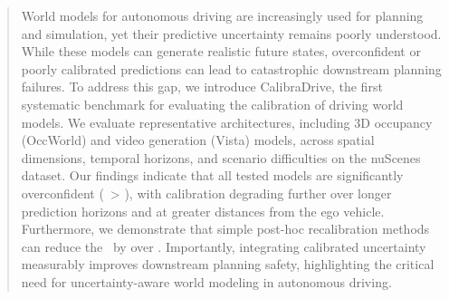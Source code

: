 \begin{abstract}
World models for autonomous driving are increasingly used for planning and simulation, yet their predictive uncertainty remains poorly understood. While these models can generate realistic future states, overconfident or poorly calibrated predictions can lead to catastrophic downstream planning failures. To address this gap, we introduce CalibraDrive, the first systematic benchmark for evaluating the calibration of driving world models. We evaluate representative architectures, including 3D occupancy (OccWorld) and video generation (Vista) models, across spatial dimensions, temporal horizons, and scenario difficulties on the nuScenes dataset. Our findings indicate that all tested models are significantly overconfident (\ece~> ), with calibration degrading further over longer prediction horizons and at greater distances from the ego vehicle. Furthermore, we demonstrate that simple post-hoc recalibration methods can reduce the \ece~by over . Importantly, integrating calibrated uncertainty measurably improves downstream planning safety, highlighting the critical need for uncertainty-aware world modeling in autonomous driving.
\end{abstract}
